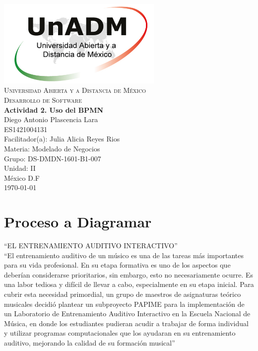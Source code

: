 \documentclass[spanish,12pt,letterpapper]{article}
\begin{document}
	\begin{titlepage}
		\begin{center}
			\includegraphics[width=0.6\textwidth]{../logoUnADM}~\\[1cm] 
			\textsc{Universidad Abierta y a Distancia de México}\\[0.8cm]
			\textsc{Desarrollo de Software}\\[1.8cm]
			
			\textbf{ \Large Actividad 2. Uso del BPMN}\\[3cm]
			
			Diego Antonio Plascencia Lara\\ ES1421004131 \\[0.4cm]
			Facilitador(a): Julia Alicia Reyes Rios\\
			Materia: Modelado de Negocios\\
			Grupo: DS-DMDN-1601-B1-007 \\
			Unidad: II \\
			
			\vfill México D.F\\{\today}
			
		\end{center}
	\end{titlepage}
	
	\section{Proceso a Diagramar}
	
	``EL ENTRENAMIENTO AUDITIVO INTERACTIVO''\\
	
	``El entrenamiento auditivo de un músico es una de las tareas más importantes para su vida profesional. En su etapa formativa es uno de los aspectos que deberían considerarse prioritarios, sin embargo, esto no necesariamente ocurre. Es una labor tediosa y difícil de llevar a cabo, especialmente en su etapa inicial. Para cubrir esta necesidad primordial, un grupo de maestros de asignaturas teórico musicales decidió plantear un subproyecto PAPIME para la implementación de un Laboratorio de Entrenamiento Auditivo Interactivo en la Escuela Nacional de Música, en donde los estudiantes pudieran acudir a trabajar de forma individual y utilizar programas computacionales que los ayudaran en su entrenamiento auditivo, mejorando la calidad de su formación musical''
	
\end{document}
